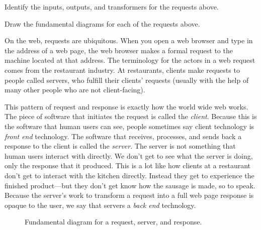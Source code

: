 \begin{question}
  \label{question:intro-transformers}
  Identify the inputs, outputs, and transformers for the requests above.
\end{question}

\begin{question}
  Draw the fundamental diagrams for each of the requests above.
\end{question}

On the web, requests are ubiquitous. When you open a web browser and type in the
address of a web page, the web browser makes a formal request to the machine
located at that address.  The
terminology for the actors in a web request comes from the restaurant industry.
At restaurants, clients make requests to people called servers, who fulfill
their clients' requests (usually with the help of many other people who are not
client-facing).

This pattern of request and response is exactly how the world wide web works.
The piece of software that initiates the request is called the \emph{client}.
Because this is the software that human users can see, people sometimes say
client technology is \emph{front end} technology. The software that receives,
processes, and sends back a response to the client is called the \emph{server}.
The server is not something that human users interact with directly. We don't
get to see what the server is doing, only the response that it produced. This is
a lot like how clients at a restaurant don't get to interact with the kitchen
directly. Instead they get to experience the finished product---but they don't
get know how the sausage is made, so to speak. Because the server's work to
transform a request into a full web page response is opaque to the user, we say
that servers a \emph{back end} technology.

\begin{figure}[h]
  
\caption{\label{fig:intro-example-request-response} Fundamental diagram for a
request, server, and response.}
\end{figure}

